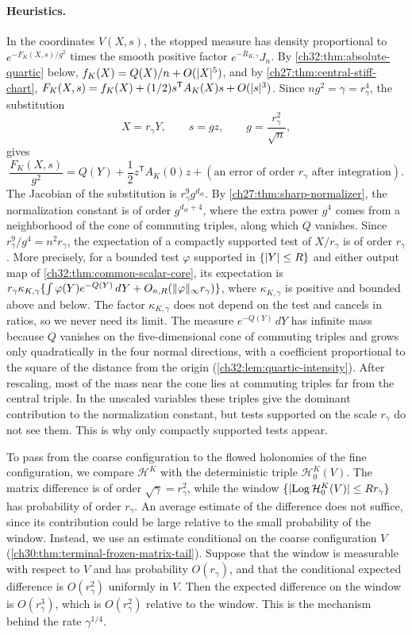 \paragraph{Heuristics.}
In the coordinates $V(X,s)$, the stopped measure has density proportional to $e^{-F_K(X,s)/g^2}$ times the smooth positive factor $e^{-\overline R_{K,\gamma}}J_n$. By \cref{ch32:thm:absolute-quartic} below, $f_K(X)=Q(X)/n+O(\lvert X\rvert^5)$, and by \cref{ch27:thm:central-stiff-chart}, $F_K(X,s)=f_K(X)+(1/2)s^{\mathsf T}A_K(X)s+O(\lvert s\rvert^3)$. Since $ng^2=\gamma=r_\gamma^4$, the substitution
\[
 X=r_\gamma Y,\qquad s=gz,\qquad g=\frac{r_\gamma^2}{\sqrt n},
\]
gives
\[
 \frac{F_K(X,s)}{g^2}=Q(Y)+\frac12z^{\mathsf T}A_K(0)z+(\text{an error of order }r_\gamma\text{ after integration}).
\]
The Jacobian of the substitution is $r_\gamma^9g^{d_{\mathrm{st}}}$. By \cref{ch27:thm:sharp-normalizer}, the normalization constant is of order $g^{d_{\mathrm{st}}+4}$, where the extra power $g^4$ comes from a neighborhood of the cone of commuting triples, along which $Q$ vanishes. Since $r_\gamma^9/g^4=n^2r_\gamma$, the expectation of a compactly supported test of $X/r_\gamma$ is of order $r_\gamma$. More precisely, for a bounded test $\varphi$ supported in $\{\lvert Y\rvert\le R\}$ and either output map of \cref{ch32:thm:common-scalar-core}, its expectation is $r_\gamma\kappa_{K,\gamma}\{\int\varphi(Y)e^{-Q(Y)}\,dY+O_{n,R}(\lVert \varphi\rVert_\infty r_\gamma)\}$, where $\kappa_{K,\gamma}$ is positive and bounded above and below. The factor $\kappa_{K,\gamma}$ does not depend on the test and cancels in ratios, so we never need its limit. The measure $e^{-Q(Y)}\,dY$ has infinite mass because $Q$ vanishes on the five-dimensional cone of commuting triples and grows only quadratically in the four normal directions, with a coefficient proportional to the square of the distance from the origin (\cref{ch32:lem:quartic-intensity}). After rescaling, most of the mass near the cone lies at commuting triples far from the central triple. In the unscaled variables these triples give the dominant contribution to the normalization constant, but tests supported on the scale $r_\gamma$ do not see them. This is why only compactly supported tests appear.

To pass from the coarse configuration to the flowed holonomies of the fine configuration, we compare $\mathcal H^K$ with the deterministic triple $\mathcal H^K_0(V)$. The matrix difference is of order $\sqrt\gamma=r_\gamma^2$, while the window $\{\lvert \operatorname{Log}\mathcal H^K_0(V)\rvert\le Rr_\gamma\}$ has probability of order $r_\gamma$. An average estimate of the difference does not suffice, since its contribution could be large relative to the small probability of the window. Instead, we use an estimate conditional on the coarse configuration $V$ (\cref{ch30:thm:terminal-frozen-matrix-tail}). Suppose that the window is measurable with respect to $V$ and has probability $O(r_\gamma)$, and that the conditional expected difference is $O(r_\gamma^2)$ uniformly in $V$. Then the expected difference on the window is $O(r_\gamma^3)$, which is $O(r_\gamma^2)$ relative to the window. This is the mechanism behind the rate $\gamma^{1/4}$.


